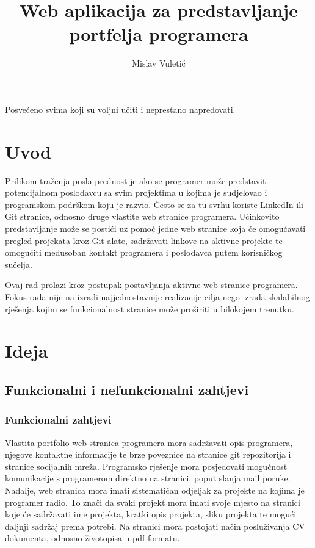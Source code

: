 \documentclass[times, utf8, zavrsni, numeric]{fer}
\begin{document}

\title{Web aplikacija za predstavljanje portfelja programera}

\author{Mislav Vuletić}

\maketitle

\zahvala{}
Posvećeno svima koji su voljni učiti i neprestano napredovati.

\tableofcontents

\chapter{Uvod}
\qquad Prilikom traženja posla prednost je ako se programer može predstaviti potencijalnom poslodavcu sa svim projektima u kojima je sudjelovao i programskom podrškom koju je razvio.
Često se za tu svrhu koriste LinkedIn\footnotemark{} ili Git\footnotemark{} stranice, odnosno druge vlastite web stranice programera.
Učinkovito predstavljanje može se postići uz pomoć jedne web stranice koja će omogućavati pregled projekata kroz Git alate, sadržavati linkove na aktivne projekte te omogućiti međusoban kontakt programera i poslodavca putem korisničkog sučelja.

Ovaj rad prolazi kroz postupak postavljanja aktivne web stranice programera.
Fokus rada nije na izradi najjednostavnije realizacije cilja nego izrada skalabilnog rješenja kojim se funkcionalnost stranice može proširiti u bilokojem trenutku.

\chapter{Ideja}
\section{Funkcionalni i nefunkcionalni zahtjevi}
\subsection{Funkcionalni zahtjevi}
\qquad Vlastita portfolio web stranica programera mora sadržavati opis programera, njegove kontaktne informacije te brze poveznice na stranice git repozitorija i stranice socijalnih mreža.
Programsko rješenje mora posjedovati mogučnost komunikacije s programerom direktno na stranici, poput slanja mail poruke.
Nadalje, web stranica mora imati sistematičan odjeljak za projekte na kojima je programer radio.
To znači da svaki projekt mora imati svoje mjesto na stranici koje će sadržavati ime projekta, kratki opis projekta, sliku projekta te mogući daljnji sadržaj prema potrebi.
Na stranici mora postojati način posluživanja CV dokumenta, odnosno životopisa u pdf formatu.
\end{document}
